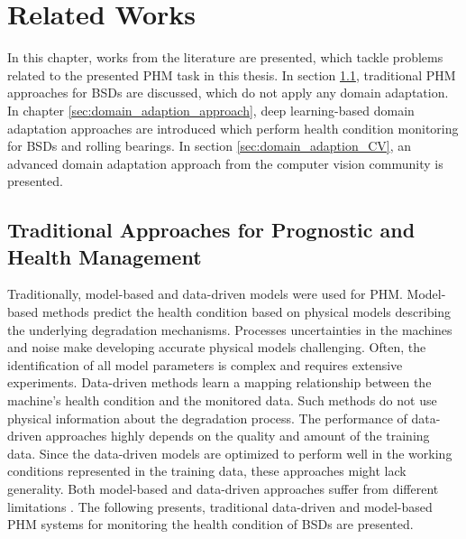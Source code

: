
\chapter{Related Works}\label{chapter:related_works}
In this chapter, works from the literature are presented, which tackle problems related to the presented PHM task in this thesis. In section \ref{sec:traditional_approaches}, traditional PHM approaches for BSDs are discussed, which do not apply any domain adaptation. In chapter \ref{sec:domain_adaption_approach}, deep learning-based domain adaptation approaches are introduced which perform health condition monitoring for BSDs and rolling bearings. In section \ref{sec:domain_adaption_CV}, an advanced domain adaptation approach from the computer vision community is presented. 

\section{Traditional Approaches for Prognostic and Health Management}\label{sec:traditional_approaches}

Traditionally, model-based and data-driven models were used for PHM. Model-based methods predict the health condition based on physical models describing the underlying degradation mechanisms. Processes uncertainties in the machines and noise make developing accurate physical models challenging. Often, the identification of all model parameters is complex and requires extensive experiments. Data-driven methods learn a mapping relationship between the machine's health condition and the monitored data. Such methods do not use physical information about the degradation process. The performance of data-driven approaches highly depends on the quality and amount of the training data. Since the data-driven models are optimized to perform well in the working conditions represented in the training data, these approaches might lack generality. Both model-based and data-driven approaches suffer from different limitations \cite{DENG2020}. The following presents, traditional data-driven and model-based PHM systems for monitoring the health condition of BSDs are presented.

